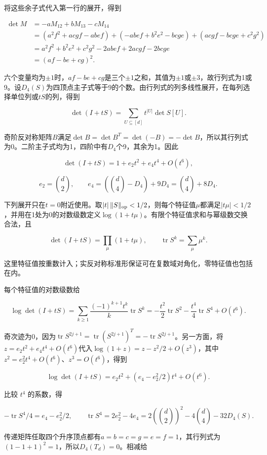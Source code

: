 \documentclass[11pt,a4paper]{article}
\begin{document}
将这些余子式代入第一行的展开，得到

\[\begin{aligned}
\det M
&=-aM_{12}+bM_{13}-cM_{14}\\
&=(a^2f^2+acgf-abef)
+(-abef+b^2e^2-bcge)
+(acgf-bcge+c^2g^2)\\
&=a^2f^2+b^2e^2+c^2g^2-2abef+2acgf-2bcge\\
&=(af-be+cg)^2.
\end{aligned}\]

六个变量均为\(\pm1\)时，\(af-be+cg\)是三个\(\pm1\)之和，其值为\(\pm1\)或\(\pm3\)，故行列式为1或9。设\(D_4(S)\)为四顶点主子式等于9的个数。由行列式的列多线性展开，在每列选择单位列或\(tS\)的列，得到

\[\det(I+tS)=\sum_{U\subseteq[d]}t^{|U|}\det S[U].\]

奇阶反对称矩阵\(B\)满足\(\det B=\det B^T=\det(-B)=-\det B\)，所以其行列式为0。二阶主子式均为1，四阶中有\(D_4\)个9，其余为1。因此

\[\det(I+tS)=1+e_2t^2+e_4t^4+O(t^6),\]

\[e_2=\binom d2,\qquad
e_4=(\binom d4-D_4)+9D_4=\binom d4+8D_4.\]

下列展开只在\(t=0\)附近使用。取\(|t|\,\|S\|_{\rm op}<1/2\)，则每个特征值\(\mu\)都满足\(|t\mu|<1/2\)，并用在1处为0的对数级数定义\(\log(1+t\mu)\)。有限个特征值求和与幂级数交换合法，且

\[\det(I+tS)=\prod_\mu(1+t\mu),\qquad
\operatorname{tr}S^k=\sum_\mu\mu^k.\]

这里特征值按重数计入；实反对称标准形保证可在复数域对角化，零特征值也包括在内。

每个特征值的对数级数给

\[\log\det(I+tS)
=\sum_{k\ge1}\frac{(-1)^{k+1}t^k}{k}\operatorname{tr}S^k
=-\frac{t^2}{2}\operatorname{tr}S^2
-\frac{t^4}{4}\operatorname{tr}S^4+O(t^6).\]

奇次迹为0，因为\(\operatorname{tr}S^{2j+1}=\operatorname{tr}(S^{2j+1})^T=-\operatorname{tr}S^{2j+1}\)。另一方面，将\(z=e_2t^2+e_4t^4+O(t^6)\)代入\(\log(1+z)=z-z^2/2+O(z^3)\)，其中\(z^2=e_2^2t^4+O(t^6)\)、\(z^3=O(t^6)\)，得到

\[\log\det(I+tS)=e_2t^2+(e_4-e_2^2/2)t^4+O(t^6).\]

比较 \(t^4\) 的系数，得

\[-\operatorname{tr}S^4/4=e_4-e_2^2/2,\qquad
\operatorname{tr}S^4=2e_2^2-4e_4
=2\left(\binom d2\right)^2-4\binom d4-32D_4(S).\]

传递矩阵任取四个升序顶点都有\(a=b=c=g=e=f=1\)，其行列式为\((1-1+1)^2=1\)，所以\(D_4(T_d)=0\)。相减给
\end{document}
